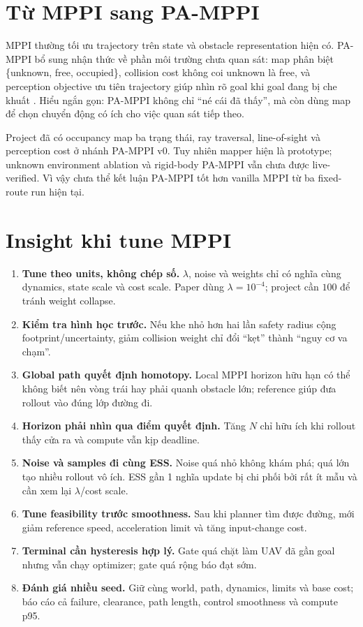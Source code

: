 \documentclass[10pt,a4paper]{article}
\begin{document}
\section{Từ MPPI sang PA-MPPI}

MPPI thường tối ưu trajectory trên state và obstacle representation hiện có.
PA-MPPI bổ sung nhận thức về phần môi trường chưa quan sát: map phân biệt
\{unknown, free, occupied\}, collision cost không coi unknown là free, và
perception objective ưu tiên trajectory giúp nhìn rõ goal khi goal đang bị che
khuất \cite{zhai2026pamppi}. Hiểu ngắn gọn: PA-MPPI không chỉ ``né cái đã
thấy'', mà còn dùng map để chọn chuyển động có ích cho việc quan sát tiếp theo.

Project đã có occupancy map ba trạng thái, ray traversal, line-of-sight và
perception cost ở nhánh PA-MPPI v0. Tuy nhiên mapper hiện là prototype; unknown
environment ablation và rigid-body PA-MPPI vẫn chưa được live-verified. Vì vậy
chưa thể kết luận PA-MPPI tốt hơn vanilla MPPI từ ba fixed-route run hiện tại.

\section{Insight khi tune MPPI}

\begin{enumerate}
  \item \textbf{Tune theo units, không chép số.} $\lambda$, noise và weights
  chỉ có nghĩa cùng dynamics, state scale và cost scale. Paper dùng
  $\lambda=10^{-4}$; project cần $100$ để tránh weight collapse.
  \item \textbf{Kiểm tra hình học trước.} Nếu khe nhỏ hơn hai lần safety radius
  cộng footprint/uncertainty, giảm collision weight chỉ đổi ``kẹt'' thành
  ``nguy cơ va chạm''.
  \item \textbf{Global path quyết định homotopy.} Local MPPI horizon hữu hạn có
  thể không biết nên vòng trái hay phải quanh obstacle lớn; reference giúp đưa
  rollout vào đúng lớp đường đi.
  \item \textbf{Horizon phải nhìn qua điểm quyết định.} Tăng $N$ chỉ hữu ích
  khi rollout thấy cửa ra và compute vẫn kịp deadline.
  \item \textbf{Noise và samples đi cùng ESS.} Noise quá nhỏ không khám phá;
  quá lớn tạo nhiều rollout vô ích. ESS gần 1 nghĩa update bị chi phối bởi rất
  ít mẫu và cần xem lại $\lambda$/cost scale.
  \item \textbf{Tune feasibility trước smoothness.} Sau khi planner tìm được
  đường, mới giảm reference speed, acceleration limit và tăng input-change cost.
  \item \textbf{Terminal cần hysteresis hợp lý.} Gate quá chặt làm UAV đã gần
  goal nhưng vẫn chạy optimizer; gate quá rộng báo đạt sớm.
  \item \textbf{Đánh giá nhiều seed.} Giữ cùng world, path, dynamics, limits và
  base cost; báo cáo cả failure, clearance, path length, control smoothness và
  compute p95.
\end{enumerate}
\end{document}
